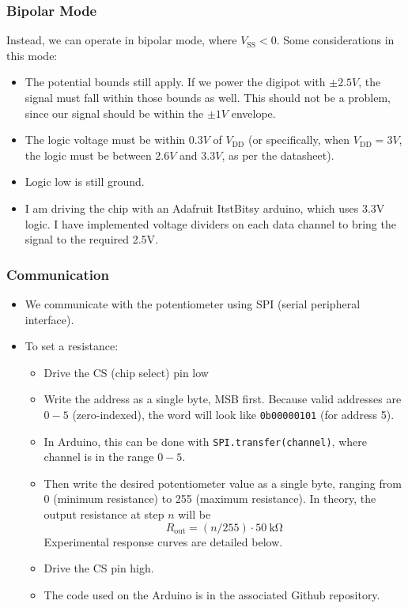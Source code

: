 \documentclass{article}
\begin{document}
    \subsubsection*{Bipolar Mode}
         Instead, we can operate in bipolar mode, where $V_{\text{SS}} < 0$. Some considerations in this mode:
        \begin{itemize}
            \item The potential bounds still apply. If we power the digipot with $\pm 2.5V$, the signal must fall within those bounds as well. This should not be a problem, since our signal should be within the $\pm1V$ envelope.
            \item The logic voltage must be within $0.3V$ of $V_\text{DD}$ (or specifically, when $V_\text{DD} = 3V$, the logic must be between $2.6V$ and $3.3V$, as per the datasheet).
            \item Logic low is still ground.
            \item I am driving the chip with an Adafruit ItstBitsy arduino, which uses 3.3V logic. I have implemented voltage dividers on each data channel to bring the signal to the required 2.5V.
        \end{itemize}
    \subsubsection*{Communication}
        \begin{itemize}
            \item We communicate with the potentiometer using SPI (serial peripheral interface).
            \item To set a resistance:
            \begin{itemize}
                \item Drive the CS (chip select) pin low
                \item Write the address as a single byte, MSB first. Because valid addresses are $0-5$ (zero-indexed), the word will look like \texttt{0b00000101} (for address 5).
                \item In Arduino, this can be done with \texttt{SPI.transfer(channel)}, where channel is in the range $0-5$.
                \item Then write the desired potentiometer value as a single byte, ranging from 0 (minimum resistance) to 255 (maximum resistance). In theory, the output resistance at step $n$ will be
                \begin{equation*}
                    R_\text{out} = (n/255)\cdot \SI{50}{\kilo\ohm}
                \end{equation*}
                Experimental response curves are detailed below.
                \item Drive the CS pin high.
                \item The code used on the Arduino is in the associated Github repository.
            \end{itemize}
        \end{itemize}
\end{document}
